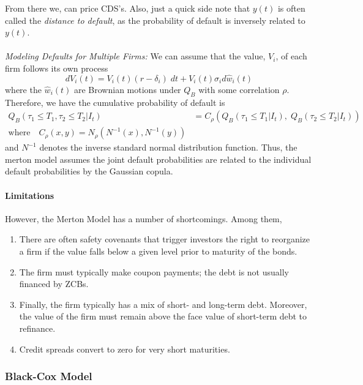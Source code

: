 \documentclass[a4paper,12pt]{scrartcl}
\begin{document}
From there we, can price CDS's.
Also, just a quick side note that $y(t)$ is often called the 
\emph{distance to default}, as the
probability of default is inversely related to $y(t)$.
\\
\\
{\sl Modeling Defaults for Multiple Firms:} We can assume that the
value, $V_i$, of each firm follows its own process
   \[ dV_i(t) = V_i(t) (r-\delta_i)\; dt + V_i(t) \sigma_i d\hat{w}_i(t)
      \]
where the $\hat{w}_i(t)$ are Brownian motions under $Q_B$
with some correlation $\rho$. Therefore, we have the cumulative
probability of default is
\begin{align*}
   Q_B(\tau_1 \leq T_1, \tau_2 \leq T_2 | I_t) &= C_\rho(
      Q_B(\tau_1 \leq T_1|I_t), \; Q_B(\tau_2 \leq T_2 | I_t)) \\
   \text{where} \quad C_\rho(x,y) = N_\rho(N^{-1}(x), N^{-1}(y))
\end{align*}
and $N^{-1}$ denotes the inverse standard normal distribution function.
Thus, the merton model assumes the joint default probabilities are
related to the individual default probabilities by the Gaussian copula.

\paragraph{Limitations} However, the Merton Model has a number of
shortcomings. Among them,
\begin{enumerate}
   \item There are often safety covenants that trigger investors
      the right to reorganize a firm if the value falls below a given
      level prior to maturity of the bonds.
   \item The firm must typically make coupon payments; the debt is
      not usually financed by ZCBs.
   \item Finally, the firm typically has a mix of short- and long-term
      debt. Moreover, the value of the firm must remain above the face 
      value of short-term debt to refinance.
   \item Credit spreads convert to zero for very short maturities.
\end{enumerate}

\newpage
\subsubsection{Black-Cox Model}
\end{document}
